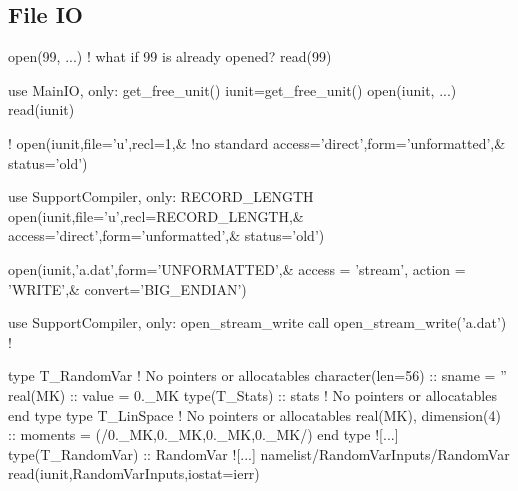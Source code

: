 \documentclass{article}
\begin{document}
\subsection{File IO}
\label{sec:fileio}
\begin{codea}


open(99, ...) ! what if 99 is already opened?
read(99)
\end{codea} 
\begin{codeb}
use MainIO, only: get_free_unit()
iunit=get_free_unit()
open(iunit, ...)
read(iunit)
\end{codeb}
\begin{codea}
!
open(iunit,file='u',recl=1,& !no standard 
    access='direct',form='unformatted',&
    status='old')
\end{codea} 
\begin{codeb}
use SupportCompiler, only: RECORD_LENGTH
open(iunit,file='u',recl=RECORD_LENGTH,& 
    access='direct',form='unformatted',&
    status='old')
\end{codeb}
\begin{codea}
open(iunit,'a.dat',form='UNFORMATTED',&
     access = 'stream', action = 'WRITE',&
     convert='BIG_ENDIAN') 
\end{codea} 
\begin{codeb}
use SupportCompiler, only: open_stream_write
call open_stream_write('a.dat') 
!
\end{codeb}
\begin{codefull}
    type T_RandomVar ! No pointers or allocatables
        character(len=56)   :: sname = ''
        real(MK)            :: value = 0._MK
        type(T_Stats)       :: stats ! No pointers or allocatables
    end type
    type T_LinSpace ! No pointers or allocatables
        real(MK), dimension(4)  :: moments = (/0._MK,0._MK,0._MK,0._MK/)
    end type
    ![...]
    type(T_RandomVar) :: RandomVar
    ![...]
    namelist/RandomVarInputs/RandomVar
    read(iunit,RandomVarInputs,iostat=ierr)
\end{codefull} 
\end{document}
